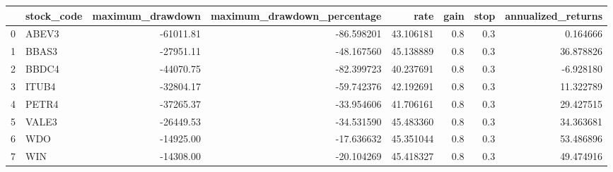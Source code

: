 \begin{tabular}{llrrrrrr}
\toprule
{} & stock\_code &  maximum\_drawdown &  maximum\_drawdown\_percentage &       rate &  gain &  stop &  annualized\_returns \\
\midrule
0 &      ABEV3 &         -61011.81 &                   -86.598201 &  43.106181 &   0.8 &   0.3 &            0.164666 \\
1 &      BBAS3 &         -27951.11 &                   -48.167560 &  45.138889 &   0.8 &   0.3 &           36.878826 \\
2 &      BBDC4 &         -44070.75 &                   -82.399723 &  40.237691 &   0.8 &   0.3 &           -6.928180 \\
3 &      ITUB4 &         -32804.17 &                   -59.742376 &  42.192691 &   0.8 &   0.3 &           11.322789 \\
4 &      PETR4 &         -37265.37 &                   -33.954606 &  41.706161 &   0.8 &   0.3 &           29.427515 \\
5 &      VALE3 &         -26449.53 &                   -34.531590 &  45.483360 &   0.8 &   0.3 &           34.363681 \\
6 &        WDO &         -14925.00 &                   -17.636632 &  45.351044 &   0.8 &   0.3 &           53.486896 \\
7 &        WIN &         -14308.00 &                   -20.104269 &  45.418327 &   0.8 &   0.3 &           49.474916 \\
\bottomrule
\end{tabular}
